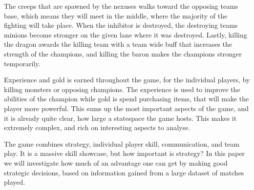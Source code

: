 The creeps that are spawned by the nexuses walks toward the opposing teams base, which means they will meet in the middle, where the majority of the fighting will take place. When the inhibitor is destroyed, the destroying teams minions become stronger on the given lane where it was destroyed. Lastly, killing the dragon awards the killing team with a team wide buff that increases the strength of the champions, and killing the baron makes the champions stronger temporarily.

Experience and gold is earned throughout the game, for the individual players, by killing monsters or opposing champions. The experience is used to improve the abilities of the champion while gold is spend purchasing items, that will make the player more powerful. This sums up the most important aspects of the game, and it is already quite clear, how large a statespace the game hosts. This makes it extremely complex, and rich on interesting aspects to analyse.

The game combines strategy, individual player skill, communication, and team play. It is a massive skill showcase, but how important is strategy? In this paper we will investigate how much of an advantage one can get by making good strategic decisions, based on information gained from a large dataset of matches played.



